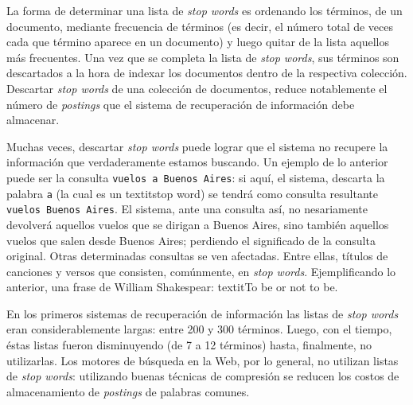 		La forma de determinar una lista de \textit{stop words} es ordenando los términos, de un documento, mediante frecuencia de términos (es decir, el número total de veces cada que término aparece en un documento) y luego quitar de la lista aquellos más frecuentes. Una vez que se completa la lista de \textit{stop words}, sus términos son descartados a la hora de indexar los documentos dentro de la respectiva colección. Descartar \textit{stop words} de una colección de documentos, reduce notablemente el número de \textit{postings} que el sistema de recuperación de información debe almacenar. \par
		
		Muchas veces, descartar \textit{stop words} puede lograr que el sistema no recupere la información que verdaderamente estamos buscando. Un ejemplo de lo anterior puede ser la consulta \texttt{vuelos a Buenos Aires}: si aquí, el sistema, descarta la palabra \texttt{a} (la cual es un textit{stop word}) se tendrá como consulta resultante \texttt{vuelos Buenos Aires}. El sistema, ante una consulta así, no nesariamente devolverá aquellos vuelos que se dirigan a Buenos Aires, sino también aquellos vuelos que salen desde Buenos Aires; perdiendo el significado de la consulta original. Otras determinadas consultas se ven afectadas. Entre ellas, títulos de canciones y versos que  consisten, comúnmente, en \textit{stop words}. Ejemplificando lo anterior, una frase de William Shakespear: textit{To be or not to be}. \par
		
		En los primeros sistemas de recuperación de información las listas de \textit{stop words} eran considerablemente largas: entre 200 y 300 términos. Luego, con el tiempo, éstas listas fueron disminuyendo (de 7 a 12 términos) hasta, finalmente, no utilizarlas. Los motores de búsqueda en la Web, por lo general, no utilizan listas de \textit{stop words}: utilizando buenas técnicas de compresión se reducen los costos de almacenamiento de \textit{postings} de palabras comunes.
		
